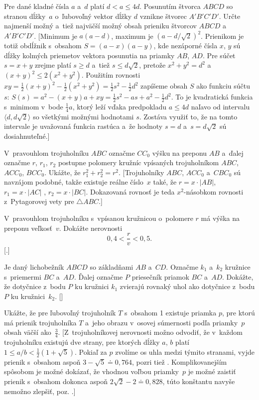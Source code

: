 {Pre dané kladné čísla $a$ a~$d$ platí $d<a\leq 4d$.
Posunutím štvorca $ABCD$ so stranou dĺžky~$a$ o~ľubovoľný vektor dĺžky $d$ vznikne štvorec $A'B'C'D'$. Určte najmenší možný a~tiež najväčší možný obsah prieniku štvorcov $ABCD$ a~$A'B'C'D'$. [Minimum je $a(a-d)$, maximum je $(a-d/\sqrt2)^2$. Prienikom je totiž obdĺžnik s~obsahom $S=(a-x)(a-y)$, kde nezáporné čísla $x$, $y$ sú dĺžky kolmých priemetov vektora posunutia na priamky $AB$, $AD$. Pre súčet $s=x+y$ zrejme platí $s\geq d$ a~tiež $s\leq d\sqrt2$, pretože $x^2+y^2=d^2$ a~$(x+y)^2\leq2(x^2+y^2)$. Použitím rovnosti $xy=\frac12(x+y)^2-\frac12(x^2+y^2)=\frac12s^2-\frac12d^2$ zapíšeme obsah $S$ ako funkciu súčtu $s$:
$S(s)=a^2-(x+y)a+xy=\frac12s^2-as+a^2-\frac12d^2$. To je kvadratická funkcia s~minimom v~bode $\frac14a$, ktorý leží vďaka predpokladu $a\leq4d$ naľavo od intervalu $\langle d, d\sqrt2\rangle$ so všetkými možnými hodnotami $s$. Zostáva využiť to, že na tomto intervale je uvažovaná funkcia rastúca a~že hodnoty $s=d$ a~$s=d\sqrt2$ sú dosiahnuteľné.]

V~pravouhlom trojuholníku $ABC$ označme $CC_0$ výšku na preponu $AB$ a~ďalej označme $r$, $r_1$, $r_2$ postupne polomery kružníc vpísaných trojuholníkom $ABC$, $ACC_0$, $BCC_0$. Ukážte, že $r_1^2+r_2^2=r^2$.
\obrplus{}
 [Trojuholníky $ABC$, $ACC_0$ a~$CBC_0$ sú navzájom podobné, takže existuje reálne číslo~$x$ také, že $r=x\cdot|AB|$, $r_1=x\cdot |AC|$ , $r_2=x\cdot |BC|$. Dokazovaná rovnosť je teda $x^2$-násobkom rovnosti z~Pytagorovej vety pre $\triangle ABC$.]

V~pravouhlom trojuholníku s~vpísanou kružnicou o~polomere $r$ má výška na preponu veľkosť~$v$. Dokážte nerovnosti
$$
0{,}4<\frac{r}{v}<0{,}5.
$$
[.]

Je daný lichobežník $ABCD$ so základňami $AB$ a~$CD$. Označme $k_1$ a~$k_2$ kružnice s~priemermi $BC$ a~$AD$. Ďalej označme $P$ priesečník priamok $BC$ a~$AD$. Dokážte, že dotyčnice z~bodu $P$ ku kružnici $k_1$ zvierajú rovnaký uhol ako dotyčnice z~bodu $P$ ku kružnici~$k_2$.
 []

Ukážte, že pre ľubovoľný trojuholník $T$ s~obsahom 1 existuje priamka $p$, pre ktorú má
prienik trojuholníka $T$ a~jeho obrazu v~osovej súmernosti podľa priamky~$p$ obsah väčší ako~$\frac34$.
 [Z~trojuholníkovej nerovnosti možno odvodiť, že v~každom trojuholníku existujú dve strany, pre ktorých dĺžky $a$, $b$ platí $1\le a/b<\frac12(1+\sqrt5)$. Pokiaľ za $p$ zvolíme os uhla medzi týmito stranami, vyjde prienik s~obsahom aspoň $3-\sqrt 5\doteq 0{,}764$, pozri tiež .
 Komplikovanejším spôsobom je možné dokázať, že vhodnou voľbou priamky~$p$ je možné zaistiť prienik s~obsahom dokonca aspoň $2\sqrt2-2\doteq 0{,}828$, túto konštantu navyše nemožno zlepšiť, poz. .]

}
